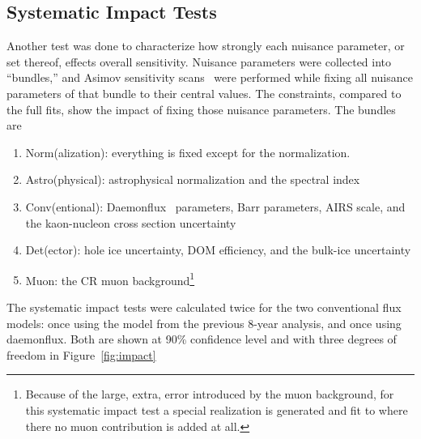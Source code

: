 \documentclass[main.tex]{subfiles}
\begin{document}
\subsection{Systematic Impact Tests}

Another test was done to characterize how strongly each nuisance parameter, or set thereof, effects overall sensitivity. 
Nuisance parameters were collected into ``bundles,'' and Asimov sensitivity scans~\cite{Cowan_2011} were performed while fixing all nuisance parameters of that bundle to their central values.
The constraints, compared to the full fits, show the impact of fixing those nuisance parameters. 
The bundles are 
\begin{enumerate}
    \item Norm(alization): everything is fixed except for the normalization.
    \item Astro(physical): astrophysical normalization and the spectral index
    \item Conv(entional): Daemonflux~\cite{yanez2023daemonflux} parameters, Barr parameters, AIRS scale, and the kaon-nucleon cross section uncertainty
    \item Det(ector): hole ice uncertainty, DOM efficiency, and the bulk-ice uncertainty
    \item Muon: the CR muon background\footnote{Because of the large, extra, error introduced by the muon background, for this systematic impact test a special realization is generated and fit to where there no muon contribution is added at all.}
\end{enumerate}
The systematic impact tests were calculated twice for the two conventional flux models: once using the model from the previous 8-year analysis, and once using daemonflux. 
Both are shown at 90\% confidence level and with three degrees of freedom in Figure~\ref{fig:impact}
\end{document}
